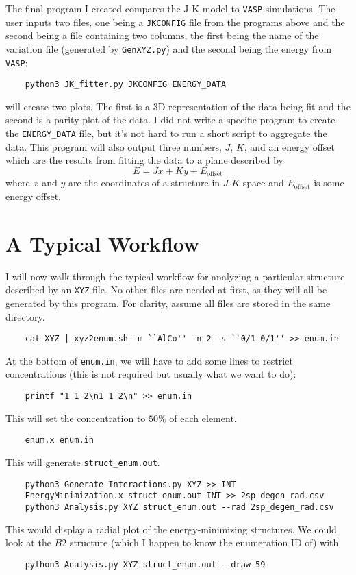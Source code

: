 \documentclass[12pt]{article}
\begin{document}
The final program I created compares the J-K model to \texttt{VASP} simulations. The user inputs two files, one being a \texttt{JKCONFIG} file from the programs above and the second being a file containing two columns, the first being the name of the variation file (generated by \texttt{GenXYZ.py}) and the second being the energy from \texttt{VASP}:
\begin{verbatim}
    python3 JK_fitter.py JKCONFIG ENERGY_DATA
\end{verbatim}
will create two plots. The first is a 3D representation of the data being fit and the second is a parity plot of the data. I did not write a specific program to create the \texttt{ENERGY\_DATA} file, but it's not hard to run a short script to aggregate the data. This program will also output three numbers, $ J $, $ K $, and an energy offset which are the results from fitting the data to a plane described by
\begin{equation}
    E = J x + K y + E_{\text{offset}}
\end{equation}
where $ x $ and $ y $ are the coordinates of a structure in $ J $-$ K $ space and $ E_{\text{offset}} $ is some energy offset.

\section{A Typical Workflow}

I will now walk through the typical workflow for analyzing a particular structure described by an \texttt{XYZ} file. No other files are needed at first, as they will all be generated by this program. For clarity, assume all files are stored in the same directory.
\begin{verbatim}
    cat XYZ | xyz2enum.sh -m ``AlCo'' -n 2 -s ``0/1 0/1'' >> enum.in
\end{verbatim}

At the bottom of \texttt{enum.in}, we will have to add some lines to restrict concentrations (this is not required but usually what we want to do):
\begin{verbatim}
    printf "1 1 2\n1 1 2\n" >> enum.in
\end{verbatim}
This will set the concentration to $ 50\% $ of each element.
\begin{verbatim}
    enum.x enum.in
\end{verbatim}
This will generate \texttt{struct\_enum.out}.
\begin{verbatim}
    python3 Generate_Interactions.py XYZ >> INT
    EnergyMinimization.x struct_enum.out INT >> 2sp_degen_rad.csv
    python3 Analysis.py XYZ struct_enum.out --rad 2sp_degen_rad.csv
\end{verbatim}
This would display a radial plot of the energy-minimizing structures. We could look at the $ B2 $ structure (which I happen to know the enumeration ID of) with
\begin{verbatim}
    python3 Analysis.py XYZ struct_enum.out --draw 59
\end{verbatim}
\end{document}
